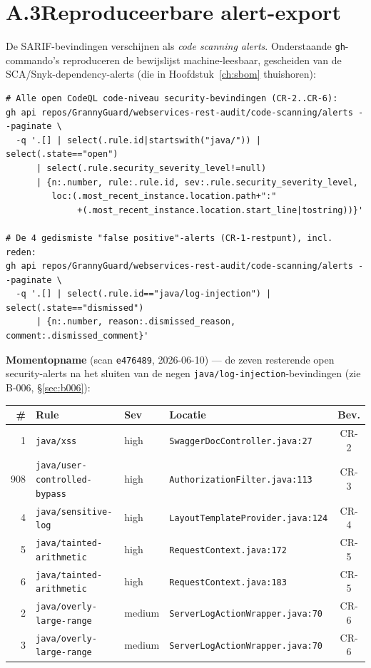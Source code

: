 \documentclass[12pt, a4paper]{report}
\begin{document}
\section*{A.3\quad Reproduceerbare alert-export}

De SARIF-bevindingen verschijnen als \emph{code scanning alerts}. Onderstaande
\texttt{gh}-commando's reproduceren de bewijslijst machine-leesbaar, gescheiden
van de SCA/Snyk-dependency-alerts (die in Hoofdstuk~\ref{ch:sbom} thuishoren):

\begin{lstlisting}[basicstyle=\ttfamily\scriptsize, breaklines=true, frame=single]
# Alle open CodeQL code-niveau security-bevindingen (CR-2..CR-6):
gh api repos/GrannyGuard/webservices-rest-audit/code-scanning/alerts --paginate \
  -q '.[] | select(.rule.id|startswith("java/")) | select(.state=="open")
      | select(.rule.security_severity_level!=null)
      | {n:.number, rule:.rule.id, sev:.rule.security_severity_level,
         loc:(.most_recent_instance.location.path+":"
              +(.most_recent_instance.location.start_line|tostring))}'

# De 4 gedismiste "false positive"-alerts (CR-1-restpunt), incl. reden:
gh api repos/GrannyGuard/webservices-rest-audit/code-scanning/alerts --paginate \
  -q '.[] | select(.rule.id=="java/log-injection") | select(.state=="dismissed")
      | {n:.number, reason:.dismissed_reason, comment:.dismissed_comment}'
\end{lstlisting}

\noindent\textbf{Momentopname} (scan \texttt{e476489}, 2026-06-10) --- de zeven
resterende open security-alerts na het sluiten van de negen
\texttt{java/log-injection}-bevindingen (zie B-006, \S\ref{sec:b006}):

\vspace{0.4em}
{\small
\begin{tabular}{@{}r l l l c@{}}
\toprule
\textbf{\#} & \textbf{Rule} & \textbf{Sev} & \textbf{Locatie} & \textbf{Bev.} \\
\midrule
1   & \texttt{java/xss}                   & high   & \texttt{SwaggerDocController.java:27}     & CR-2 \\
908 & \texttt{java/user-controlled-bypass}& high   & \texttt{AuthorizationFilter.java:113}     & CR-3 \\
4   & \texttt{java/sensitive-log}         & high   & \texttt{LayoutTemplateProvider.java:124}  & CR-4 \\
5   & \texttt{java/tainted-arithmetic}    & high   & \texttt{RequestContext.java:172}          & CR-5 \\
6   & \texttt{java/tainted-arithmetic}    & high   & \texttt{RequestContext.java:183}          & CR-5 \\
2   & \texttt{java/overly-large-range}    & medium & \texttt{ServerLogActionWrapper.java:70}   & CR-6 \\
3   & \texttt{java/overly-large-range}    & medium & \texttt{ServerLogActionWrapper.java:70}   & CR-6 \\
\bottomrule
\end{tabular}
}
\end{document}
